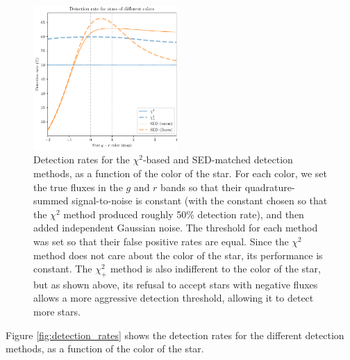 \documentclass[11pt,letterpaper,linenumbers]{aastex63}
\newcommand{\chipos}{\chi_+}
\begin{document}
\begin{figure}
  \begin{center}
    \includegraphics[width=0.49\textwidth]{chisq-pos-color}%
  \end{center}
  \caption{Detection rates for the $\chi^2$-based and SED-matched
    detection methods, as a function of the color of the star.  For
    each color, we set the true fluxes in the $g$ and $r$ bands so
    that their quadrature-summed signal-to-noise is constant (with the
    constant chosen so that the $\chi^2$ method produced roughly 50\%
    detection rate), and then added independent Gaussian noise.  The
    threshold for each method was set so that their false positive
    rates are equal.  Since the $\chi^2$ method does not care about
    the color of the star, its performance is constant.  The
    $\chipos^2$ method is also indifferent to the color of the star,
    but as shown above, its refusal to accept stars with negative
    fluxes allows a more aggressive detection threshold, allowing it
    to detect more stars.  
  \label{fig:chipos_colors}}
\end{figure}

Figure \ref{fig:detection_rates} shows the detection rates for the
different detection methods, as a function of the color of the star.

\end{document}
